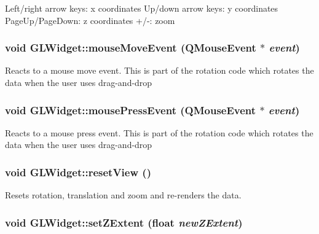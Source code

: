 Left/right arrow keys: x coordinates Up/down arrow keys: y coordinates PageUp/PageDown: z coordinates +/-\/: zoom \hypertarget{class_g_l_widget_a9043bac13d6f0a5307ea5c7f9b3caa50}{
\subsubsection[{mouseMoveEvent}]{\setlength{\rightskip}{0pt plus 5cm}void GLWidget::mouseMoveEvent (QMouseEvent $\ast$ {\em event})}}
\label{class_g_l_widget_a9043bac13d6f0a5307ea5c7f9b3caa50}
Reacts to a mouse move event. This is part of the rotation code which rotates the data when the user uses drag-\/and-\/drop \hypertarget{class_g_l_widget_ab144cc8064c1bbf6d0ef0646ca0bd06c}{
\subsubsection[{mousePressEvent}]{\setlength{\rightskip}{0pt plus 5cm}void GLWidget::mousePressEvent (QMouseEvent $\ast$ {\em event})}}
\label{class_g_l_widget_ab144cc8064c1bbf6d0ef0646ca0bd06c}
Reacts to a mouse press event. This is part of the rotation code which rotates the data when the user uses drag-\/and-\/drop \hypertarget{class_g_l_widget_ae0cb1922c7f58b363fe4577a8a2c5d1e}{
\subsubsection[{resetView}]{\setlength{\rightskip}{0pt plus 5cm}void GLWidget::resetView ()}}
\label{class_g_l_widget_ae0cb1922c7f58b363fe4577a8a2c5d1e}
Resets rotation, translation and zoom and re-\/renders the data. \hypertarget{class_g_l_widget_a68406450ab1961b48ebc786cb61b4d48}{
\subsubsection[{setZExtent}]{\setlength{\rightskip}{0pt plus 5cm}void GLWidget::setZExtent (float {\em newZExtent})}}
